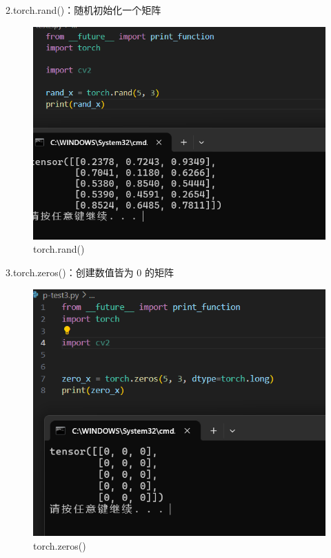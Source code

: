 \documentclass[a4paper, 12pt]{article}
\begin{document}
2.torch.rand()：随机初始化一个矩阵
\begin{figure}[H]
  \centering
  \includegraphics[width=\textwidth]{屏幕截图 2024-09-15 102156.png}
  \caption{torch.rand()}
\end{figure}

3.torch.zeros()：创建数值皆为 0 的矩阵
\begin{figure}[H]
  \centering
  \includegraphics[width=\textwidth]{屏幕截图 2024-09-15 102246.png}
  \caption{torch.zeros()}
\end{figure}
\end{document}

